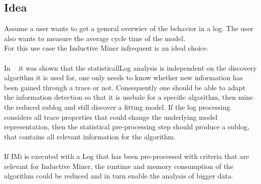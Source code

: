 \documentclass[
	a4paper,
	pagesize,
	pdftex,
	12pt,
	twoside, %
	BCOR=5mm, %
	ngerman,
	fleqn,
	final,
	]{scrartcl}
\begin{document}
\subsection{Idea}
Assume a user wants to get a general overwiev of the behavior in a log. The user also wants to measure the average cycle time of the model.\\
For this use case the Inductive Miner infrequent is an ideal choice.
\\\\
In ~\cite{PartialLogAnalysis} it was shown that the statisticallLog analysis is independent on the discovery algorithm it is used for, one only needs to know whether new information has been gained through a trace or not. Consequently one should be able to adapt the information detection so that it is usebale for a specific algorithm, then mine the reduced sublog and still discover a fitting model. If the log processing considers all trace properties that could change the underlying model representation, then the statistical pre-processing step should produce a sublog, that contains all relevant information for the algorithm.\\\\
If IMi is executed with a Log that has been pre-processed with criteria that are relevant for Inductive Miner, the runtime and memory consumption of the algorithm could be reduced and in turn enable the analysis of bigger data.\\
\end{document}
